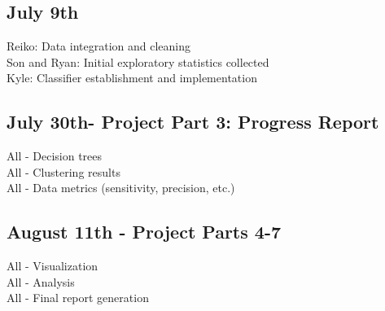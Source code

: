 \documentclass[11pt,sigconf]{acmart}
\begin{document}
\subsection{July 9th}
Reiko: Data integration and cleaning\\
Son and Ryan: Initial exploratory statistics collected \\
Kyle: Classifier establishment and implementation\\

\subsection{July 30th- Project Part 3: Progress Report}
All - Decision trees \\
All - Clustering results \\
All - Data metrics (sensitivity, precision, etc.)\\

\subsection{August 11th - Project Parts 4-7}
All - Visualization \\
All - Analysis \\
All - Final report generation\\



 
\end{document}

